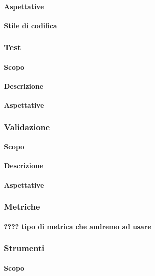 \paragraph{Aspettative}
\paragraph{Stile di codifica}

\subsubsection{Test}
\paragraph{Scopo}
\paragraph{Descrizione}
\paragraph{Aspettative}

\subsubsection{Validazione}
\paragraph{Scopo}
\paragraph{Descrizione}
\paragraph{Aspettative}

\subsubsection{Metriche}
\paragraph{???? tipo di metrica che andremo ad usare}

\subsubsection{Strumenti}
\paragraph{Scopo}









